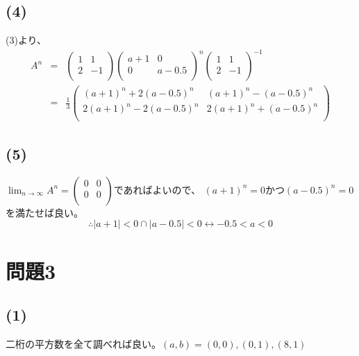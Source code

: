 \documentclass[]{jsarticle}
\begin{document}
    \subsection*{(4)}
        (3)より、
            \begin{eqnarray}
                A^n &=& \begin{pmatrix}
                    1 & 1 \\
                    2 & -1 \\
                \end{pmatrix}\begin{pmatrix}
                    a + 1 & 0 \\
                    0 & a - 0.5 \\
                \end{pmatrix}^n\begin{pmatrix}
                    1 & 1 \\
                    2 & -1 \\
                \end{pmatrix}^{-1} \nonumber \\
                &=& \frac{1}{3}\begin{pmatrix}
                    (a + 1)^n + 2(a - 0.5)^n & (a + 1)^n - (a - 0.5)^n \\
                    2(a + 1)^n - 2(a - 0.5)^n & 2(a + 1)^n + (a - 0.5)^n \\
                \end{pmatrix} \nonumber
            \end{eqnarray}
    \subsection*{(5)}
        $\displaystyle\lim_{n\rightarrow\infty}A^n = \begin{pmatrix}
            0 & 0 \\
            0 & 0 \\
        \end{pmatrix}$であればよいので、
        $(a + 1)^n = 0$かつ$(a - 0.5)^n = 0$
        を満たせば良い。
        \begin{equation*}
            \therefore |a + 1| < 0 \cap |a - 0.5| < 0 \leftrightarrow -0.5 < a < 0
        \end{equation*}
\section*{問題3}
    \subsection*{(1)}
        二桁の平方数を全て調べれば良い。$(a, b) = (0, 0), (0, 1), (8, 1)$
\end{document}
